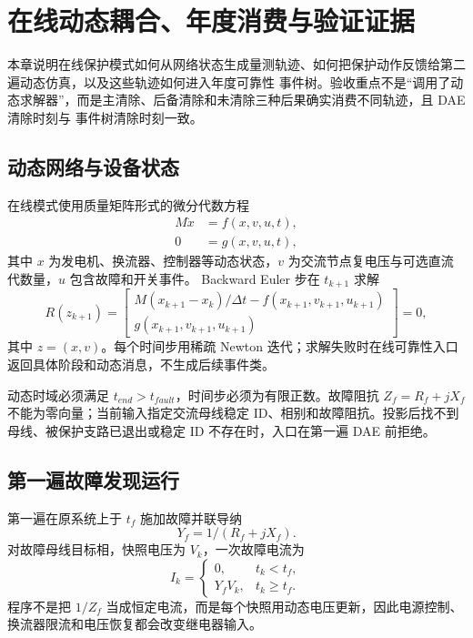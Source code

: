 \section{在线动态耦合、年度消费与验证证据}\label{sec:rel-online-dae-validation}

本章说明在线保护模式如何从网络状态生成量测轨迹、如何把保护动作反馈给第二遍动态仿真，以及这些轨迹如何进入年度可靠性
事件树。验收重点不是“调用了动态求解器”，而是主清除、后备清除和未清除三种后果确实消费不同轨迹，且 DAE 清除时刻与
事件树清除时刻一致。

\subsection{动态网络与设备状态}
在线模式使用质量矩阵形式的微分代数方程
\begin{align}
 M\dot x&=f(x,v,u,t),\\
 0&=g(x,v,u,t),
\end{align}
其中 $x$ 为发电机、换流器、控制器等动态状态，$v$ 为交流节点复电压与可选直流代数量，$u$ 包含故障和开关事件。
Backward Euler 步在 $t_{k+1}$ 求解
\begin{equation}
 R(z_{k+1})=
 \begin{bmatrix}
 M(x_{k+1}-x_k)/\Delta t-f(x_{k+1},v_{k+1},u_{k+1})\\
 g(x_{k+1},v_{k+1},u_{k+1})
 \end{bmatrix}=0,
\end{equation}
其中 $z=(x,v)$。每个时间步用稀疏 Newton 迭代；求解失败时在线可靠性入口返回具体阶段和动态消息，不生成后续事件类。

动态时域必须满足 $t_{end}>t_{fault}$，时间步必须为有限正数。故障阻抗
$Z_f=R_f+jX_f$ 不能为零向量；当前输入指定交流母线稳定 ID、相别和故障阻抗。投影后找不到母线、被保护支路已退出或稳定
ID 不存在时，入口在第一遍 DAE 前拒绝。

\subsection{第一遍故障发现运行}
第一遍在原系统上于 $t_f$ 施加故障并联导纳
\begin{equation}
 Y_f=1/(R_f+jX_f).
\end{equation}
对故障母线目标相，快照电压为 $V_k$，一次故障电流为
\begin{equation}
 I_k=\begin{cases}0,&t_k<t_f,\\Y_fV_k,&t_k\ge t_f.\end{cases}
\end{equation}
程序不是把 $1/Z_f$ 当成恒定电流，而是每个快照用动态电压更新，因此电源控制、换流器限流和电压恢复都会改变继电器输入。

